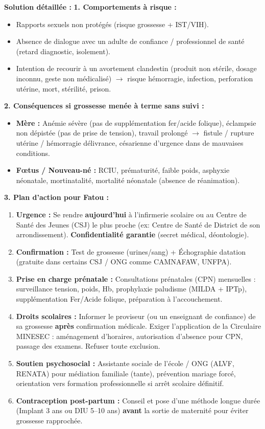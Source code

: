 \documentclass[11pt]{article}
\begin{document}
\begin{exoresolu}
\tcblower
\textbf{Solution détaillée :}
\textbf{1. Comportements à risque :}
\begin{itemize}
    \item Rapports sexuels non protégés (risque grossesse + IST/VIH).
    \item Absence de dialogue avec un adulte de confiance / professionnel de santé (retard diagnostic, isolement).
    \item Intention de recourir à un avortement clandestin (produit non stérile, dosage inconnu, geste non médicalisé) $\rightarrow$ risque hémorragie, infection, perforation utérine, mort, stérilité, prison.
\end{itemize}
\textbf{2. Conséquences si grossesse menée à terme sans suivi :}
\begin{itemize}
    \item \textbf{Mère :} Anémie sévère (pas de supplémentation fer/acide folique), éclampsie non dépistée (pas de prise de tension), travail prolongé $\rightarrow$ fistule / rupture utérine / hémorragie délivrance, césarienne d'urgence dans de mauvaises conditions.
    \item \textbf{Fœtus / Nouveau-né :} RCIU, prématurité, faible poids, asphyxie néonatale, mortinatalité, mortalité néonatale (absence de réanimation).
\end{itemize}
\textbf{3. Plan d'action pour Fatou :}
\begin{enumerate}
    \item \textbf{Urgence :} Se rendre \textbf{aujourd'hui} à l'infirmerie scolaire ou au Centre de Santé des Jeunes (CSJ) le plus proche (ex: Centre de Santé de District de son arrondissement). \textbf{Confidentialité garantie} (secret médical, déontologie).
    \item \textbf{Confirmation :} Test de grossesse (urines/sang) + Échographie datation (gratuite dans certains CSJ / ONG comme CAMNAFAW, UNFPA).
    \item \textbf{Prise en charge prénatale :} Consultations prénatales (CPN) mensuelles : surveillance tension, poids, Hb, prophylaxie paludisme (MILDA + IPTp), supplémentation Fer/Acide folique, préparation à l'accouchement.
    \item \textbf{Droits scolaires :} Informer le proviseur (ou un enseignant de confiance) de sa grossesse \textbf{après} confirmation médicale. Exiger l'application de la Circulaire MINESEC : aménagement d'horaires, autorisation d'absence pour CPN, passage des examens. Refuser toute exclusion.
    \item \textbf{Soutien psychosocial :} Assistante sociale de l'école / ONG (ALVF, RENATA) pour médiation familiale (tante), prévention mariage forcé, orientation vers formation professionnelle si arrêt scolaire définitif.
    \item \textbf{Contraception post-partum :} Conseil et pose d'une méthode longue durée (Implant 3 ans ou DIU 5--10 ans) \textbf{avant} la sortie de maternité pour éviter grossesse rapprochée.
\end{enumerate}
\end{exoresolu}
\end{document}
